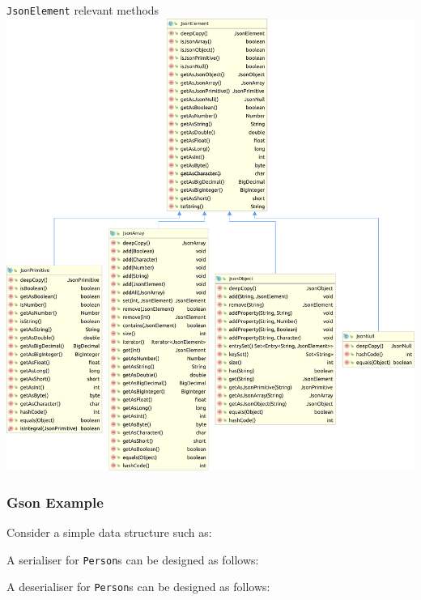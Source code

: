 \documentclass[presentation]{beamer}\mode<presentation>{\usetheme{AMSCesenaPurpleAndGold}}
\begin{document}
\begin{frame}[allowframebreaks]
    \begin{exampleblock}{\texttt{JsonElement} relevant methods}
        \centering
        \includegraphics[height=.7\textheight]{./img/JsonElement.pdf}
    \end{exampleblock}

\end{frame}

\begin{frame}[allowframebreaks]
    \frametitle{Gson Example}

    Consider a simple data structure such as:
    

    \framebreak

    A serialiser for \texttt{Person}s can be designed as follows:
    

    \framebreak

    A deserialiser for \texttt{Person}s can be designed as follows:
    

\end{frame}
\end{document}
